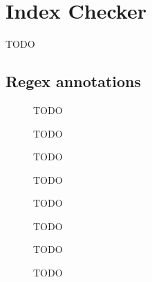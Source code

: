 \chapter{Index Checker\label{index-checker}}
TODO

\section{Regex annotations\label{regex-annotations}}

\begin{description}
\item[]
	TODO
\item[]
	TODO
\item[]
	TODO
\item[]
	TODO
\item[]
	TODO
\item[]
	TODO
\end{description}

\begin{figure}
\caption{TODO}
\label{fig-index-figure}
\end{figure}

\begin{figure}
\caption{TODO}
\label{fig-index-heirarchy}
\end{figure}